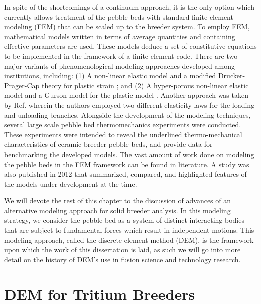 In spite of the shortcomings of a continuum approach, it is the only option which currently allows treatment of the pebble beds with standard finite element modeling (FEM) that can be scaled up to the breeder system. To employ FEM, mathematical models written in terms of average quantities and containing effective parameters are used. These models deduce a set of constitutive equations to be implemented in the framework of a finite element code.  There are two major variants of phenomenological modeling approaches developed among institutions, including: (1) A non-linear elastic model and a modified Drucker-Prager-Cap theory for plastic strain \cite{Gan2007189,fokkens2003}; and (2) A hyper-porous non-linear elastic model and a Gurson model for the plastic model \cite{DellOrco:2007hc,DellOrco:2010zr,DiMaio20081287}. Another approach was taken by Ref.\cite{fokkens2003} wherein the authors employed two different elasticity laws for the loading and unloading branches. Alongside the development of the modeling techniques, several large scale pebble bed thermomechanics experiments were conducted. These experiments were intended to reveal the underlined thermo-mechanical characteristics of ceramic breeder pebble beds, and provide data for benchmarking the developed models. The vast amount of work done on modeling the pebble beds in the FEM framework can be found in literature. \cite{DellOrco:2007hc,DellOrco:2010zr,DiMaio20101234,Gan2007189,Gan2007189,Gan:2009vn,Gan:2010lh,Gan:2010kc,DellOrco:2007hc,DellOrco:2010zr,DiMaio20101234,Gan2007189,DellOrco:2007hc,DiMaio20101234} A study was also published in 2012 that summarized, compared, and highlighted features of the models under development at the time.\cite{ying2011isfnt}

We will devote the rest of this chapter to the discussion of advances of an alternative modeling approach for solid breeder analysis. In this modeling strategy, we consider the pebble bed as a system of distinct interacting bodies that are subject to fundamental forces which result in independent motions. This modeling approach, called the discrete element method (DEM), is the framework upon which the work of this dissertation is laid, as such we will go into more detail on the history of DEM's use in fusion science and technology research.

\section{DEM for Tritium Breeders}

